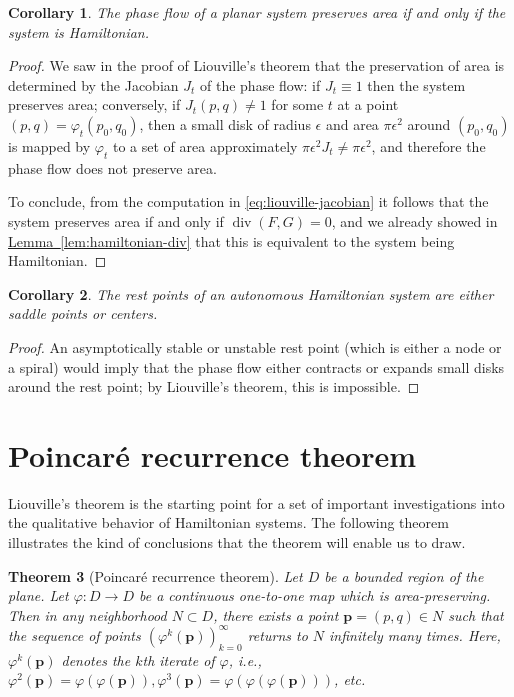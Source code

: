 \documentclass[11pt]{report}
\theoremstyle{plain}
\newtheorem{thm}{Theorem}[chapter]
\newtheorem{cor}[thm]{Corollary}
\theoremstyle{definition}
\begin{document}
\begin{cor}
The phase flow of a planar system preserves area if
and only if the system is Hamiltonian.
\end{cor}

\begin{proof}
We saw in the proof of Liouville's theorem that the
preservation of area is determined by the Jacobian
$J_t$ of the phase flow: if $J_t \equiv 1$ then the
system preserves area; conversely, if $J_t(p,q)\neq 1$
for some $t$ at a point $(p,q)=\varphi_t(p_0,q_0)$,
then a small disk of radius $\epsilon$ and area
$\pi \epsilon^2$ around $(p_0,q_0)$ is mapped by
$\varphi_t$ to a set of area approximately
$\pi \epsilon^2 J_t \neq \pi \epsilon^2$, and
therefore the phase flow does not preserve area.

To conclude, from the computation in
\eqref{eq:liouville-jacobian} it follows that the system
preserves area if and only if
$\operatorname{div}(F,G)=0$, and we already showed in
\hyperref[lem:hamiltonian-div]{Lemma~\ref*{lem:hamiltonian-div}} that this is equivalent to
the system being Hamiltonian.
\end{proof}

\begin{cor}
The rest points of an autonomous Hamiltonian system
are either saddle points or centers.
\end{cor}

\begin{proof}
An asymptotically stable or unstable rest point (which
is either a node or a spiral) would imply that the
phase flow either contracts or expands small disks
around the rest point; by Liouville's theorem, this is
impossible.
\end{proof}

\section{Poincaré recurrence theorem}

Liouville's theorem is the starting point for a set of
important investigations into the qualitative behavior
of Hamiltonian systems. The following theorem
illustrates the kind of conclusions that the theorem
will enable us to draw.

\begin{thm}[Poincaré recurrence theorem]
\label{thm:poincare-recurrence}
Let $D$ be a bounded region of the plane. Let
$\varphi:D\to D$ be a continuous one-to-one map which
is area-preserving. Then in any neighborhood
$N\subset D$, there exists a point
$\mathbf{p}=(p,q) \in N$ such that the sequence of
points $(\varphi^k(\mathbf{p}))_{k=0}^\infty$ returns
to $N$ infinitely many times. Here,
$\varphi^k(\mathbf{p})$ denotes the \emph{$k$th iterate of
$\varphi$}, i.e.,
$\varphi^2(\mathbf{p})=\varphi(\varphi(\mathbf{p})),
\varphi^3(\mathbf{p})=\varphi(\varphi(\varphi(\mathbf{p})))$,
etc.
\end{thm}
\end{document}
